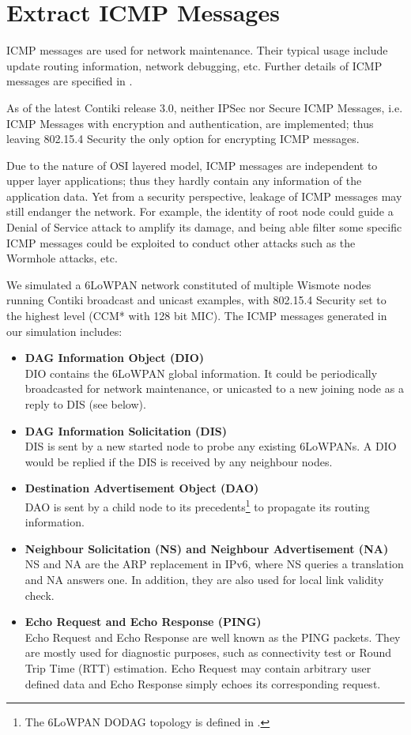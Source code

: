 \section{Extract ICMP Messages}\label{ICMPAttack}
ICMP messages are used for network maintenance.  Their typical usage include update routing information, network debugging, etc. Further details of ICMP messages are specified in \cite{rfc4443}.

As of the latest Contiki release 3.0, neither IPSec\cite{rfc4301} nor Secure ICMP Messages, i.e. ICMP Messages with encryption and authentication, are implemented; thus leaving 802.15.4 Security the only option for encrypting ICMP messages.

Due to the nature of OSI layered model\cite{OSI}, ICMP messages are independent to upper layer applications; thus they hardly contain any information of the application data. Yet from a security perspective, leakage of ICMP messages may still endanger the network. For example, the identity of root node could guide a Denial of Service attack to amplify its damage, and being able filter some specific ICMP messages could be exploited to conduct other attacks such as the Wormhole attacks\cite{Wormhole}, etc.

We simulated a 6LoWPAN network constituted of multiple Wismote\cite{Wismote} nodes running Contiki broadcast and unicast examples, with 802.15.4 Security set to the highest level (CCM* with 128 bit MIC). The ICMP messages generated in our simulation includes:
\begin{itemize}
	\item \textbf{DAG Information Object (DIO)} \\
	DIO contains the 6LoWPAN global information. It could be periodically broadcasted for network maintenance, or unicasted to a new joining node as a reply to DIS (see below).
	\item \textbf{DAG Information Solicitation (DIS)} \\
	DIS is sent by a new started node to probe any existing 6LoWPANs. A DIO would be replied if the DIS is received by any neighbour nodes.
	\item \textbf{Destination Advertisement Object (DAO)} \\
	DAO is sent by a child node to its precedents\footnote{The 6LoWPAN DODAG topology is defined in \cite{rfc6550}.} to propagate its routing information.
	\item \textbf{Neighbour Solicitation (NS) and Neighbour Advertisement (NA)} \\
	NS and NA are the ARP replacement in IPv6, where NS queries a translation and NA answers one. In addition, they are also used for local link validity check.
	\item \textbf{Echo Request and Echo Response (PING)} \\
	Echo Request and Echo Response are well known as the PING packets. They are mostly used for diagnostic purposes, such as connectivity test or Round Trip Time (RTT) estimation. Echo Request may contain arbitrary user defined data and Echo Response simply echoes its corresponding request.
\end{itemize}

